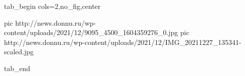  
 
 
 
 

\ifcmt
  tab_begin cols=2,no_fig,center

     pic http://news.donnu.ru/wp-content/uploads/2021/12/9095_4500_1604359276_0.jpg
		 pic http://news.donnu.ru/wp-content/uploads/2021/12/IMG_20211227_135341-scaled.jpg

  tab_end
\fi
